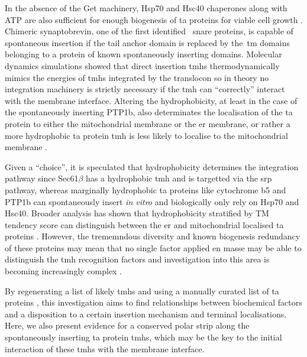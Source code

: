 In the absence of the Get machinery, Hsp70 and Hsc40 chaperones along with ATP are also sufficient for enough biogenesis of \gls{ta} proteins for viable cell growth \cite{Rabu2008, Rabu2009, Ngosuwan2003, Colombo2009, Kemper2008, Meineke2008, Setoguchi2006}.
Chimeric synaptobrevin, one of the first identified~ \gls{snare} proteins, is capable of spontaneous insertion if the tail anchor domain is replaced by the~\gls{tm} domains belonging to a protein of known spontaneously inserting domains. %
Molecular dynamics simulations showed that direct insertion \gls{tmh}s thermodynamically mimics the energies of \gls{tmh}s integrated by the translocon \cite{Ulmschneider2014} so in theory no integration machinery is strictly necessary if the \gls{tmh} can ``correctly'' interact with the membrane interface.
Altering the hydrophobicity, at least in the case of the spontaneously inserting PTP1b, also determinates the localisation of the \gls{ta} protein to either the mitochondrial membrane or the \gls{er} membrane, or rather a more hydrophobic \gls{ta} protein \gls{tmh} is less likely to localise to the mitochondrial membrane \cite{Fueller2015}.


Given a ``choice'', it is speculated that hydrophobicity determines the integration pathway since Sec61$\beta$ has a hydrophobic \gls{tmh} and is targetted via the \gls{srp} pathway, whereas marginally hydrophobic \gls{ta} proteins like cytochrome b5 and PTP1b can spontaneously insert \textit{in vitro} and biologically only rely on Hsp70 and Hsc40.
Broader analysis has shown that hydrophobicity \cite{White1999} stratified by TM tendency score \cite{Zhao2009} can distinguish between the \gls{er} and mitochondrial localised \gls{ta} proteins \cite{Guna2018}.
However, the trememndous diversity and known biogenesis redundancy of these proteins may mean that no single factor applied en masse may be able to distinguish the \gls{tmh} recognition factors and investigation into this area is becoming increasingly complex \cite{Guna2018}.

By regenerating a list of likely \gls{tmh}s \cite{Kalbfleisch2007} and using a manually curated list of \gls{ta} proteins \cite{TheUniProtConsortium2014}, this investigation aims to find relationships between biochemical factors and a disposition to a certain insertion mechanism and terminal localisations.
Here, we also present evidence for a conserved polar strip along the spontaneously inserting \gls{ta} protein \gls{tmh}s, which may be the key to the initial interaction of these \gls{tmh}s with the membrane interface.




